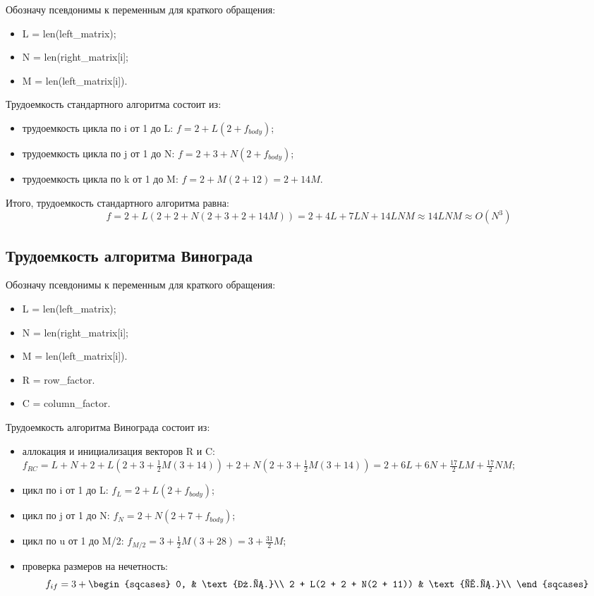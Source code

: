 Обозначу псевдонимы к переменным для краткого обращения:
\begin{itemize}
	\item L = len(left\_matrix);
	\item N = len(right\_matrix[i];
	\item M = len(left\_matrix[i]).
\end{itemize}

Трудоемкость стандартного алгоритма состоит из:
\begin{itemize}
	\item трудоемкость цикла по i от 1 до L: $f = 2 + L(2 + f_{body})$;
	\item трудоемкость цикла по j от 1 до N: $f = 2 + 3 + N(2 + f_{body})$;
	\item трудоемкость цикла по k от 1 до M: $f = 2 + M(2 + 12) = 2 + 14M$.
\end{itemize}

Итого, трудоемкость стандартного алгоритма равна:
\begin{equation}
    f = 2 + L(2 + 2 + N(2 + 3 + 2 + 14M)) = 2 + 4L + 7LN + 14LNM \approx 14LNM \approx O(N^3)
\end{equation}

\subsection{Трудоемкость алгоритма Винограда}

Обозначу псевдонимы к переменным для краткого обращения:
\begin{itemize}
	\item L = len(left\_matrix);
	\item N = len(right\_matrix[i];
	\item M = len(left\_matrix[i]).
	\item R = row\_factor.
	\item C = column\_factor.
\end{itemize}

Трудоемкость алгоритма Винограда состоит из:
\begin{itemize}
    \item аллокация и инициализация векторов R и C: $f_{RC} = L + N + 2 + L(2 + 3 + \frac{1}{2}M(3 + 14)) + 2 + N(2 + 3 + \frac{1}{2}M(3 + 14)) = 2 + 6L + 6N + \frac{17}{2}LM + \frac{17}{2}NM$;
    \item цикл по i от 1 до L: $f_{L} = 2 + L(2 + f_{body})$;
    \item цикл по j от 1 до N: $f_{N} = 2 + N(2 + 7 + f_{body})$;
    \item цикл по u от 1 до M/2: $f_{M/2} = 3 + \frac{1}{2}M(3 + 28) = 3 + \frac{31}{2}M$;
    \item проверка размеров на нечетность:
    \begin{equation}
    	f_{if} = 3 + \begin{sqcases}
    			0, & \text{л.с.}\\
    			2 + L(2 + 2 + N(2 + 11)) & \text{х.с.}\\
    		\end{sqcases}
    \end{equation}
\end{itemize}

